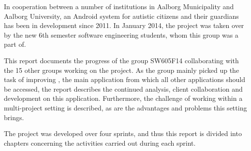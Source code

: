In cooperation between a number of institutions in Aalborg Municipality and Aalborg University, an Android system for autistic citizens and their guardians has been in development since 2011.
In January 2014, the project was taken over by the new 6th semester software engineering students, whom this group was a part of.

This report documents the progress of the group SW605F14 collaborating with the 15 other groups working on the project.
As the group mainly picked up the task of improving \launcher, the main application from which all other applications should be accessed, the report describes the continued analysis, client collaboration and development on this application.
Furthermore, the challenge of working within a multi-project setting is described, as are the advantages and problems this setting brings.

The project was developed over four sprints, and thus this report is divided into chapters concerning the activities carried out during each sprint.